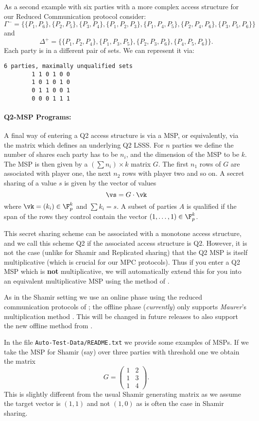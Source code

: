 \noindent
As a second example with six parties with a more complex
access structure for our Reduced Communication protocol consider:
\[\Gamma^- = \{\{P_1, P_6\}, \{P_2, P_5\}, \{P_3, P_4\}, \{P_1, P_2, P_3\}, \{P_1,
  P_4, P_5\}, \{P_2, P_4, P_6\}, \{P_3, P_5, P_6\}\}\]
and
\[\Delta^+ = \{\{P_1, P_2, P_4\}, \{P_1, P_3, P_5\}, \{P_2, P_3, P_6\}, \{P_4, P_5, P_6\}\}.\]
Each party is in a different pair of sets.  We can represent it via:
\begin{verbatim}
6 parties, maximally unqualified sets
        1 1 0 1 0 0
        1 0 1 0 1 0
        0 1 1 0 0 1
        0 0 0 1 1 1
\end{verbatim}

\paragraph{Q2-MSP Programs:}
A final way of entering a Q2 access structure is via a MSP, or equivalently,
via the matrix which defines an underlying Q2 LSSS.
For $n$ parties we define the number of shares each party has to be 
$n_i$, and the dimension of the MSP to be $k$. The MSP is then given
by a $(\sum n_i) \times k$ matrix $G$.
The first $n_1$ rows of $G$ are associated with player one, the
next $n_2$ rows with player two and so on.
A secret sharing of a value $s$ is given by the vector of values
\[ \vs = G \cdot \vk \]
where $\vk = (k_i) \in \F_p^k$ and $\sum k_i =s$.
A subset of parties $A$ is qualified if the span of the rows they control
contain the vector $(1,\ldots,1) \in \F_p^k$.

This secret sharing scheme can be associated with a monotone
access structure, and we call this scheme Q2 if the associated
access structure is Q2.
However, it is not the case (unlike for Shamir and Replicated sharing)
that the Q2 MSP is itself multiplicative (which is crucial for
our MPC protocols).
Thus if you enter a Q2 MSP which is {\bf not} multiplicative, we
will automatically extend this for you into an equivalent multiplicative MSP
using the method of \cite{CDM00}.

As in the Shamir setting we use an online phase using the reduced communication
protocols of \cite{KRSW}; 
the offline phase ({\em currently}) only supports {\em Maurer}'s multiplication method
\cite{Maurer}.
This will be changed in future releases to also support the new offline method from
\cite{SW18}.

In the file \verb+Auto-Test-Data/README.txt+ we provide some examples
of MSPs. If we take the MSP for Shamir (say) over three parties with threshold
one we obtain the matrix
\[ 
   G = \left( \begin{array}{cc}
      1 & 2 \\ 1 & 3 \\ 1 & 4 
       \end{array} \right).
\]
This is slightly different from the usual Shamir generating matrix
as we assume the target vector is $(1,1)$ and not $(1,0)$ as is often
the case in Shamir sharing.


